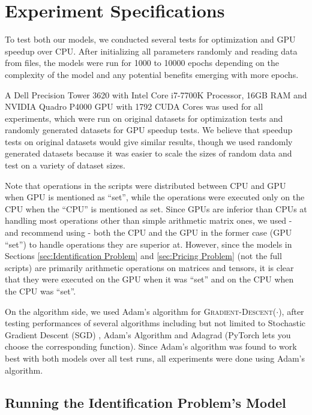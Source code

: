 \documentclass[12pt]{article}
\begin{document}
    \section{Experiment Specifications} \label{sec:Experiment Specifications}
    To test both our models, we conducted several tests for optimization and GPU speedup over CPU. After initializing all parameters randomly and reading data from files, the models were run for 1000 to 10000 epochs depending on the complexity of the model and any potential benefits emerging with more epochs.
    
    A Dell Precision Tower 3620 with Intel Core i7-7700K Processor, 16GB RAM and NVIDIA Quadro P4000 GPU with 1792 CUDA Cores was used for all experiments, which were run on original datasets for optimization tests and randomly generated datasets for GPU speedup tests. We believe that speedup tests on original datasets would give similar results, though we used randomly generated datasets because it was easier to scale the sizes of random data and test on a variety of dataset sizes.
    
    Note that operations in the scripts were distributed between CPU and GPU when GPU is mentioned as ``set'', while the operations were executed only on the CPU when the ``CPU'' is mentioned as set. Since GPUs are inferior than CPUs at handling most operations other than simple arithmetic matrix ones, we used - and recommend using - both the CPU and the GPU in the former case (GPU ``set'') to handle operations they are superior at. However, since the models in Sections \ref{sec:Identification Problem} and \ref{sec:Pricing Problem} (not the full scripts) are primarily arithmetic operations on matrices and tensors, it is clear that they were executed on the GPU when it was ``set'' and on the CPU when the CPU was ``set''.
    
    On the algorithm side, we used Adam's algorithm for \textsc{Gradient-Descent}($\cdot$), after testing performances of several algorithms including but not limited to Stochastic Gradient Descent (SGD) \cite{SGD}, Adam's Algorithm \cite{Adam} and Adagrad \cite{Adagrad} (PyTorch lets you choose the corresponding function). Since Adam's algorithm was found to work best with both models over all test runs, all experiments were done using Adam's algorithm.
    
    \subsection{Running the Identification Problem's Model} \label{sec:Running the Identification Problem's Model}
\end{document}
